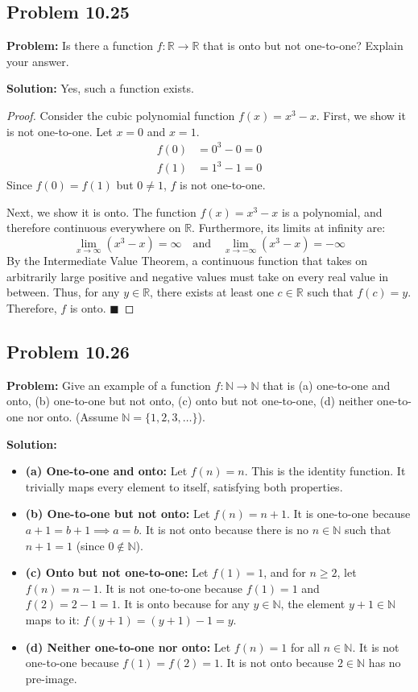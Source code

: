 \documentclass[11pt, a4paper]{article}
\theoremstyle{definition}
\theoremstyle{remark}
\newcommand{\R}{\mathbb{R}}
\newcommand{\N}{\mathbb{N}}
\begin{document}
\subsection{Problem 10.25}
\textbf{Problem:} Is there a function $f : \R \to \R$ that is onto but not one-to-one? Explain your answer.

\textbf{Solution:}
Yes, such a function exists. 
\begin{proof}
Consider the cubic polynomial function $f(x) = x^3 - x$. 
First, we show it is not one-to-one. Let $x = 0$ and $x = 1$. 
\begin{align*}
f(0) &= 0^3 - 0 = 0 \\
f(1) &= 1^3 - 1 = 0
\end{align*}
Since $f(0) = f(1)$ but $0 \neq 1$, $f$ is not one-to-one.

Next, we show it is onto. The function $f(x) = x^3 - x$ is a polynomial, and therefore continuous everywhere on $\R$. Furthermore, its limits at infinity are:
\[ \lim_{x \to \infty} (x^3 - x) = \infty \quad \text{and} \quad \lim_{x \to -\infty} (x^3 - x) = -\infty \]
By the Intermediate Value Theorem, a continuous function that takes on arbitrarily large positive and negative values must take on every real value in between. Thus, for any $y \in \R$, there exists at least one $c \in \R$ such that $f(c) = y$. Therefore, $f$ is onto. $\blacksquare$
\end{proof}

\subsection{Problem 10.26}
\textbf{Problem:} Give an example of a function $f : \N \to \N$ that is (a) one-to-one and onto, (b) one-to-one but not onto, (c) onto but not one-to-one, (d) neither one-to-one nor onto. (Assume $\N = \{1, 2, 3, \dots\}$).

\textbf{Solution:}
\begin{itemize}
    \item \textbf{(a) One-to-one and onto:} Let $f(n) = n$. This is the identity function. It trivially maps every element to itself, satisfying both properties.
    \item \textbf{(b) One-to-one but not onto:} Let $f(n) = n + 1$. It is one-to-one because $a + 1 = b + 1 \implies a = b$. It is not onto because there is no $n \in \N$ such that $n + 1 = 1$ (since $0 \notin \N$).
    \item \textbf{(c) Onto but not one-to-one:} Let $f(1) = 1$, and for $n \ge 2$, let $f(n) = n - 1$. It is not one-to-one because $f(1) = 1$ and $f(2) = 2 - 1 = 1$. It is onto because for any $y \in \N$, the element $y + 1 \in \N$ maps to it: $f(y + 1) = (y + 1) - 1 = y$.
    \item \textbf{(d) Neither one-to-one nor onto:} Let $f(n) = 1$ for all $n \in \N$. It is not one-to-one because $f(1) = f(2) = 1$. It is not onto because $2 \in \N$ has no pre-image.
\end{itemize}
\end{document}
